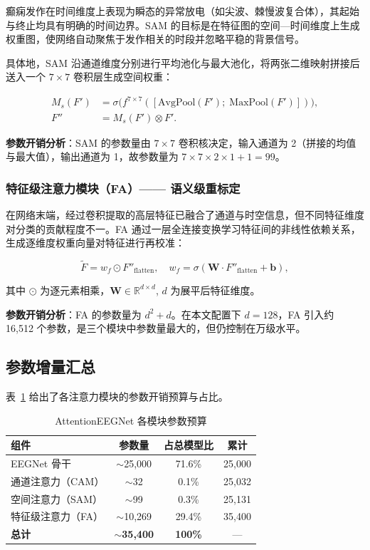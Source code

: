 \documentclass[12pt, a4paper]{article}
\begin{document}
癫痫发作在时间维度上表现为瞬态的异常放电（如尖波、棘慢波复合体），其起始与终止均具有明确的时间边界。SAM 的目标是在特征图的空间—时间维度上生成权重图，使网络自动聚焦于发作相关的时段并忽略平稳的背景信号。

具体地，SAM 沿通道维度分别进行平均池化与最大池化，将两张二维映射拼接后送入一个 $7 \times 7$ 卷积层生成空间权重：

\begin{align}
M_s(F') &= \sigma\big(f^{7\times 7}([\mathrm{AvgPool}(F');\;\mathrm{MaxPool}(F')])\big), \\
F'' &= M_s(F') \otimes F'.
\end{align}

\textbf{参数开销分析}：SAM 的参数量由 $7 \times 7$ 卷积核决定，输入通道为 2（拼接的均值与最大值），输出通道为 1，故参数量为 $7 \times 7 \times 2 \times 1 + 1 = 99$。

\subsubsection{特征级注意力模块（FA）—— 语义级重标定}

在网络末端，经过卷积提取的高层特征已融合了通道与时空信息，但不同特征维度对分类的贡献程度不一。FA 通过一层全连接变换学习特征间的非线性依赖关系，生成逐维度权重向量对特征进行再校准：

\begin{equation}
\tilde{F} = w_f \odot F''_{\text{flatten}}, \quad w_f = \sigma(\mathbf{W} \cdot F''_{\text{flatten}} + \mathbf{b}),
\end{equation}

其中 $\odot$ 为逐元素相乘，$\mathbf{W} \in \mathbb{R}^{d \times d}$, $d$ 为展平后特征维度。

\textbf{参数开销分析}：FA 的参数量为 $d^2 + d$。在本文配置下 $d=128$，FA 引入约 16,512 个参数，是三个模块中参数量最大的，但仍控制在万级水平。

\subsection{参数增量汇总}

表~\ref{tab:param_budget} 给出了各注意力模块的参数开销预算与占比。

\begin{table}[H]
\centering
\caption{AttentionEEGNet 各模块参数预算}
\label{tab:param_budget}
\begin{tabular}{lccc}
\toprule
\textbf{组件} & \textbf{参数量} & \textbf{占总模型比} & \textbf{累计} \\
\midrule
EEGNet 骨干         & $\sim$25,000  & 71.6\% & 25,000 \\
通道注意力（CAM）    & $\sim$32      & 0.1\%  & 25,032 \\
空间注意力（SAM）    & $\sim$99      & 0.3\%  & 25,131 \\
特征级注意力（FA）   & $\sim$10,269  & 29.4\% & 35,400 \\
\midrule
\textbf{总计}       & $\sim$\textbf{35,400} & \textbf{100\%} & --- \\
\bottomrule
\end{tabular}
\end{table}
\end{document}
